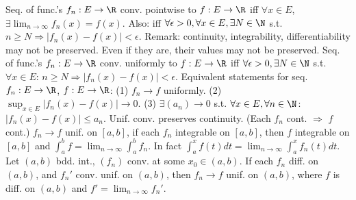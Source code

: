 Seq. of func.'s $f_n: E \to \R$ conv. pointwise to $f: E \to \R$ iff $\forall x \in E$,
$\exists \lim_{n \to \infty} f_n(x) = f(x)$.
Also: iff $\forall \epsilon > 0, \forall x \in E, \exists N \in \N$ s.t.
$n \ge N \Rightarrow |f_n(x) - f(x)| < \epsilon$.
Remark: continuity, integrability, differentiability may not be preserved.
Even if they are, their values may not be preserved.
Seq. of func.'s $f_n: E \to \R$ conv. uniformly to $f: E \to \R$ iff
$\forall \epsilon > 0, \exists N \in \N$ s.t.
$\forall x\in E:\, n \ge N \Rightarrow |f_n(x) - f(x)| < \epsilon$.
 Equivalent statements for seq. $f_n: E \to \R$, $f: E \to \R$:
(1) $f_n \to f$ uniformly.
(2) $\sup_{x \in E} |f_n(x) - f(x)| \to 0$.
(3) $\exists (a_n) \to 0$ s.t. $\forall x \in E, \forall n \in \N$: $|f_n(x) - f(x)| \le a_n$.
 Unif. conv. preserves continuity. (Each $f_n$ cont. $\Rightarrow$ $f$ cont.)
 $f_n \to f$ unif. on $[a,b]$, if each $f_n$ integrable on $[a,b]$,
then $f$ integrable on $[a,b]$ and $\int_a^b f = \lim_{n \to \infty} \int_a^b f_n$.
In fact $\int_a^x f(t) dt = \lim_{n \to \infty} \int_a^x f_n(t) dt$.
 Let $(a,b)$ bdd. int., $(f_n)$ conv. at some $x_0 \in (a,b)$.
If each $f_n$ diff. on $(a,b)$, and $f_n'$ conv. unif. on $(a,b)$, then
$f_n \to f$ unif. on $(a,b)$, where $f$ is diff. on $(a,b)$ and $f' = \lim_{n \to \infty} f_n'$.
